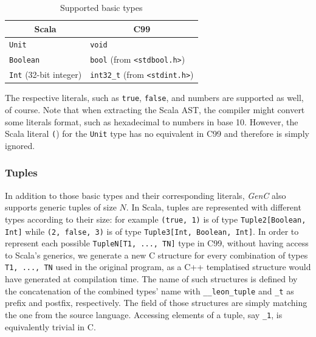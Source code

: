 \documentclass{article}
\newcommand{\inlinecode}[1]{\lstinline[basicstyle=\ttfamily]|#1|}
\newcommand{\inlineC}[1]{\lstinline[language=C99]|#1|}
\newcommand{\inlineScala}[1]{\lstinline[language=MyScala]|#1|}
\newcommand{\heading}[1]{\multicolumn{1}{c}{\textbf{#1}}}
\newcommand{\GenC}{\emph{GenC}\xspace}
\begin{document}
\begin{table}[h]
  \centering
  \begin{tabularx}{0.9\textwidth}{XX}
    \toprule

    \heading{Scala} & \heading{C99}               \\

    \midrule

    \inlineScala{Unit} & \inlineC{void}           \\

    \inlineScala{Boolean} &
    \inlineC{bool} (from \inlineC{<stdbool.h>})   \\

    \inlineScala{Int} (32-bit integer) &
    \inlineC{int32_t} (from \inlineC{<stdint.h>}) \\

    \bottomrule
  \end{tabularx}
  \caption{Supported basic types}
  \label{tab:basic-types}
\end{table}

The respective literals, such as \inlinecode{true}, \inlinecode{false}, and
numbers are supported as well, of course. Note that when extracting the Scala
AST, the compiler might convert some literals format, such as hexadecimal to
numbers in base 10. However, the Scala literal \inlineScala{(}) for the
\inlineScala{Unit} type has no equivalent in C99 and therefore is simply
ignored.



\subsubsection{Tuples}
\label{sec:tuples}

In addition to those basic types and their corresponding literals, \GenC also
supports generic tuples of size $N$. In Scala, tuples are represented with
different types according to their size: for example \inlineScala{(true, 1)} is
of type \inlineScala{Tuple2[Boolean, Int]} while \inlineScala{(2, false, 3)} is
of type \inlineScala{Tuple3[Int, Boolean, Int]}. In order to represent each
possible \inlineScala{TupleN[T1, ..., TN]} type in C99, without having access to
Scala's generics, we generate a new C structure for every combination of types
\inlineScala{T1, ..., TN} used in the original program, as a C++ templatised
structure would have generated at compilation time. The name of such structures
is defined by the concatenation of the combined types' name with
\inlineC{__leon_tuple} and \inlineC{_t} as prefix and postfix, respectively. The
field of those structures are simply matching the one from the source language.
Accessing elements of a tuple, say \inlineScala{_1}, is equivalently trivial in
C.
\end{document}
